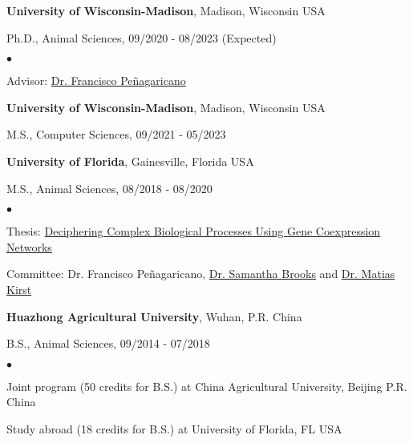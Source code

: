\documentclass[margin,line,10pt]{res}
\newenvironment{list1}{
  \begin{list}{\ding{113}}{%
      \setlength{\itemsep}{0in}
      \setlength{\parsep}{0in} \setlength{\parskip}{0in}
      \setlength{\topsep}{0in} \setlength{\partopsep}{0in} 
      \setlength{\leftmargin}{0.17in}}}{\end{list}}
\newenvironment{list2}{
  \begin{list}{$\bullet$}{%
      \setlength{\itemsep}{0in}
      \setlength{\parsep}{0in} \setlength{\parskip}{0in}
      \setlength{\topsep}{0in} \setlength{\partopsep}{0in} 
      \setlength{\leftmargin}{0.2in}}}{\end{list}}
\begin{document}
\begin{resume}
{\bf University of Wisconsin-Madison}, Madison, Wisconsin USA\\
\vspace*{-.1in}
\begin{list1}
\item[] Ph.D., Animal Sciences, 09/2020 - 08/2023 (Expected)
\begin{list2}
\vspace*{.05in}
\item Advisor: \textcolor{blue}{\href{https://andysci.wisc.edu/directory/francisco-penagaricano/}{Dr. Francisco Peñagaricano}} 
\end{list2}
\end{list1}


{\bf University of Wisconsin-Madison}, Madison, Wisconsin USA\\
\vspace*{-.1in}
\begin{list1}
\item[] M.S., Computer Sciences, 09/2021 - 05/2023
\end{list1}

{\bf University of Florida}, Gainesville, Florida USA\\
\vspace*{-.1in}
\begin{list1}
\item[] M.S., Animal Sciences,  08/2018 - 08/2020
\begin{list2}
\vspace*{.05in}
\item Thesis: \textcolor{blue}{\href{https://ufdcimages.uflib.ufl.edu/UF/E0/05/69/10/00001/Liu_L.pdf}{Deciphering Complex Biological Processes Using Gene Coexpression Networks }} 
\item Committee: Dr. Francisco Peñagaricano, \textcolor{blue}{\href{https://animal.ifas.ufl.edu/people/samantha-brooks/}{Dr. Samantha Brooks}} and \textcolor{blue}{\href{https://ffgs.ifas.ufl.edu/faculty/kirst-matias/}{Dr. Matias Kirst}} 
\end{list2}
\vspace*{.02in}
\end{list1}

{\bf Huazhong Agricultural University}, Wuhan, P.R. China\\
\vspace*{-.1in}
\begin{list1}
\item[] B.S., Animal Sciences, 09/2014 - 07/2018
\begin{list2}
\vspace*{.05in}
\item Joint program (50 credits for B.S.) at China Agricultural University, Beijing P.R. China
\item Study abroad (18 credits for B.S.) at University of Florida, FL USA
\end{list2}
\vspace*{.02in}
\end{list1}



\end{resume}
\end{document}
